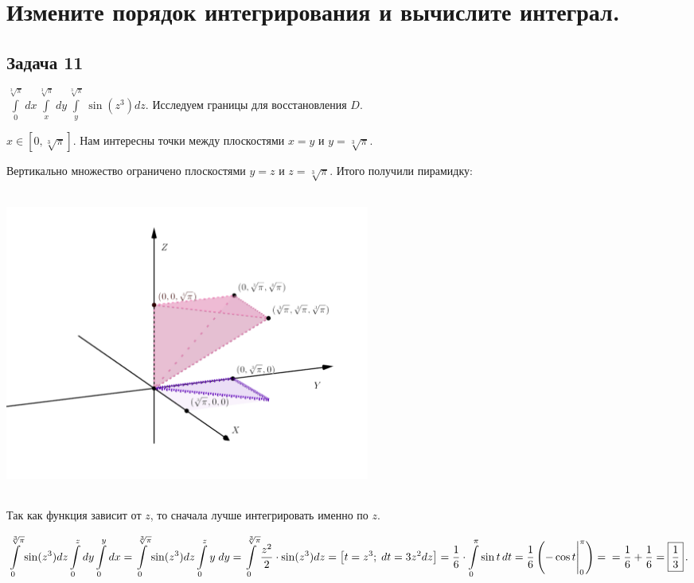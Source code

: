 \documentclass[a4paper, fleqn]{article}
\begin{document}
    \section*{Измените порядок интегрирования и вычислите интеграл.}
    
    \subsection*{Задача 11}
    
    
    $\displaystyle \int\limits_{0}^{\sqrt[3]{\pi}} dx \int\limits_{x}^{\sqrt[3]{\pi}} dy
    \int\limits_{y}^{\sqrt[3]{\pi}}\sin (z^3) dz.$ Исследуем границы для восстановления $D$.
    
    $x \in [0, \sqrt[3]{\pi}].$ Нам интересны точки между плоскостями $x = y$ и $y = \sqrt[3]{\pi}$. 
    
    Вертикально множество ограничено плоскостями $y = z$ и $z = \sqrt[3]{\pi}.$ Итого получили пирамидку:
    
    \includegraphics[width=12cm, height=10cm]{list24imgs/task 2.4.11.png}        
    
    Так как функция зависит от $z$, то сначала лучше интегрировать именно по $z$. 
    
    $\displaystyle \int \limits_{0}^{\sqrt[3]{\pi}} \sin (z^3) dz \int \limits_{0}^{z} dy
    \int \limits_{0}^{y} dx = 
     \int \limits_{0}^{\sqrt[3]{\pi}} \sin (z^3) dz \int \limits_{0}^{z} y \; dy = 
     \int \limits_{0}^{\sqrt[3]{\pi}}  \frac{z^2}{2} \cdot \sin (z^3) dz = \left[ t = z^3; \; dt = 3z^2dz \right] =  
     \frac{1}{6} \cdot \int \limits_{0}^{\pi}    \sin t \, dt = \frac{1}{6} \left( -\cos t \Bigg|_{0}^{\pi}\right) = \\ = \frac{1}{6} + \frac{1}{6} = \boxed{\frac{1}{3}} \, .$
    
\end{document}
